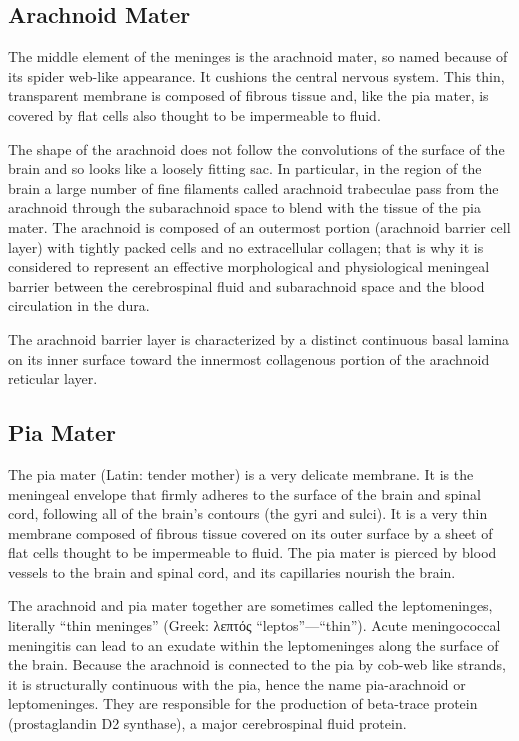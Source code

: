 \hypertarget{arachnoid-mater}{%
\subsection{Arachnoid Mater}\label{arachnoid-mater}}

The middle element of the meninges is the arachnoid mater, so named because of its spider web-like appearance. It cushions the central nervous system. This thin, transparent membrane is composed of fibrous tissue and, like the pia mater, is covered by flat cells also thought to be impermeable to fluid.

The shape of the arachnoid does not follow the convolutions of the surface of the brain and so looks like a loosely fitting sac. In particular, in the region of the brain a large number of fine filaments called arachnoid trabeculae pass from the arachnoid through the subarachnoid space to blend with the tissue of the pia mater. The arachnoid is composed of an outermost portion (arachnoid barrier cell layer) with tightly packed cells and no extracellular collagen; that is why it is considered to represent an effective morphological and physiological meningeal barrier between the cerebrospinal fluid and subarachnoid space and the blood circulation in the dura.

The arachnoid barrier layer is characterized by a distinct continuous basal lamina on its inner surface toward the innermost collagenous portion of the arachnoid reticular layer.

\hypertarget{pia-mater}{%
\subsection{Pia Mater}\label{pia-mater}}

The pia mater (Latin: tender mother) is a very delicate membrane. It is the meningeal envelope that firmly adheres to the surface of the brain and spinal cord, following all of the brain's contours (the gyri and sulci). It is a very thin membrane composed of fibrous tissue covered on its outer surface by a sheet of flat cells thought to be impermeable to fluid. The pia mater is pierced by blood vessels to the brain and spinal cord, and its capillaries nourish the brain.

The arachnoid and pia mater together are sometimes called the leptomeninges, literally ``thin meninges'' (Greek: λεπτός ``leptos''---``thin''). Acute meningococcal meningitis can lead to an exudate within the leptomeninges along the surface of the brain. Because the arachnoid is connected to the pia by cob-web like strands, it is structurally continuous with the pia, hence the name pia-arachnoid or leptomeninges. They are responsible for the production of beta-trace protein (prostaglandin D2 synthase), a major cerebrospinal fluid protein.


